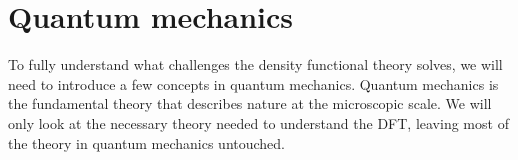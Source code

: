 \section{Quantum mechanics}

To fully understand what challenges the density functional theory solves, we will need to introduce a few concepts in quantum mechanics. Quantum mechanics is the fundamental theory that describes nature at the microscopic scale. We will only look at the necessary theory needed to understand the DFT, leaving most of the theory in quantum mechanics untouched.

